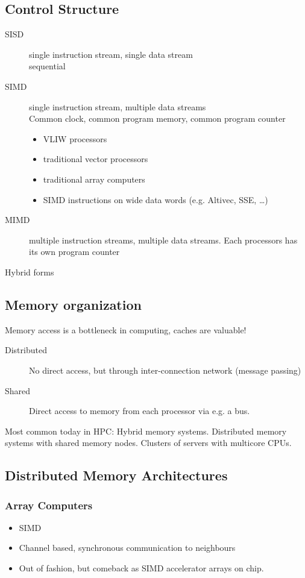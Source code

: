\documentclass[a4paper]{article}
\begin{document}
\subsection{Control Structure}
\begin{description}
    \item[SISD] single instruction stream, single data stream\\ sequential
    \item[SIMD] single instruction stream, multiple data streams\\
        Common clock, common program memory, common program counter
        \begin{itemize}
            \item VLIW processors
            \item traditional vector processors
            \item traditional array computers
            \item SIMD instructions on wide data words (e.g. Altivec, SSE, \ldots)
        \end{itemize}
    \item[MIMD] multiple instruction streams, multiple data streams. Each processors has its own program counter
    \item[Hybrid forms]
\end{description}

\subsection{Memory organization}
Memory access is a bottleneck in computing, caches are valuable!
\begin{description}
    \item[Distributed] No direct access, but through inter-connection network
        (message passing)
    \item[Shared] Direct access to memory from each processor via e.g. a bus.
\end{description}
Most common today in HPC: Hybrid memory systems. Distributed memory systems with
shared memory nodes. Clusters of servers with multicore CPUs.

\subsection{Distributed Memory Architectures}
\subsubsection{Array Computers}
\begin{itemize}
    \item SIMD
    \item Channel based, synchronous communication to neighbours
    \item Out of fashion, but comeback as SIMD accelerator arrays on chip.
\end{itemize}
\end{document}
